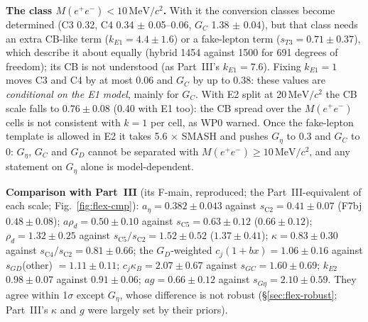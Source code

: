 \documentclass[11pt,a4paper]{article}
\newcommand{\Mee}{\ensuremath{M(e^{+}e^{-})}\xspace}
\newcommand{\MeVcc}{\ensuremath{\mathrm{MeV}/c^{2}}\xspace}
\newcommand{\aEta}{\ensuremath{a_\eta}\xspace}
\newcommand{\kB}{\ensuremath{\kappa_B}\xspace}
\newcommand{\rhod}{\ensuremath{\rho_d}\xspace}
\newcommand{\kEone}{\ensuremath{k_{E1}}\xspace}
\newcommand{\kEtwo}{\ensuremath{k_{E2}}\xspace}
\newcommand{\Geta}{\ensuremath{G_\eta}\xspace}
\begin{document}
\textbf{The class \Mee$<10$\,\MeVcc.} With it the conversion classes become determined (C3 0.32, C4 0.34 $\pm$ 0.05--0.06, $G_C$ 1.38 $\pm$ 0.04), but
that class needs an extra CB-like term ($\kEone=4.4\pm1.6$) or a fake-lepton term ($s_{T3}=0.71\pm0.37$), which describe it about equally
(hybrid 1454 against 1500 for 691 degrees of freedom); its CB is not understood (as Part~III's $\kEone=7.6$). Fixing $\kEone=1$ moves C3 and C4 by at
most 0.06 and $G_C$ by up to 0.38: these values are \emph{conditional on the E1 model}, mainly for $G_C$. With E2 split at 20\,\MeVcc the CB scale
falls to $0.76\pm0.08$ (0.40 with E1 too): the CB spread over the \Mee cells is not consistent with $k=1$ per cell, as WP0 warned. Once the
fake-lepton template is allowed in E2 it takes 5.6 $\times$ SMASH and pushes \Geta to 0.3 and $G_C$ to 0: \Geta, $G_C$ and $G_D$ cannot be
separated with \Mee$\ge10$\,\MeVcc, and any statement on \Geta alone is model-dependent.

\textbf{Comparison with Part~III} (its F-main, reproduced; the Part~III-equivalent of each scale; Fig.~\ref{fig:flex-cmp}): $\aEta=0.382\pm0.043$
against $s_{\mathrm{C2}}=0.41\pm0.07$ (F7bj $0.48\pm0.08$); $a\rhod=0.50\pm0.10$ against $s_{\mathrm{C5}}=0.63\pm0.12$ ($0.66\pm0.12$); $\rhod=1.32\pm0.25$
against $s_{\mathrm{C5}}/s_{\mathrm{C2}}=1.52\pm0.52$ ($1.37\pm0.41$); $\kappa=0.83\pm0.30$ against $s_{\mathrm{C4}}/s_{\mathrm{C2}}=0.81\pm0.66$; the
$G_D$-weighted $c_j(1+bx)=1.06\pm0.16$ against $s_{GD}$(other) $=1.11\pm0.11$; $c_j\kB=2.07\pm0.67$ against $s_{GC}=1.60\pm0.69$; $\kEtwo$ $0.98\pm0.07$
against $0.91\pm0.06$; $ag=0.66\pm0.12$ against $s_{G\eta}=2.10\pm0.59$. They agree within 1$\sigma$ except \Geta, whose difference is not robust
(\S\ref{sec:flex-robust}; Part~III's $\kappa$ and $g$ were largely set by their priors).
\end{document}

